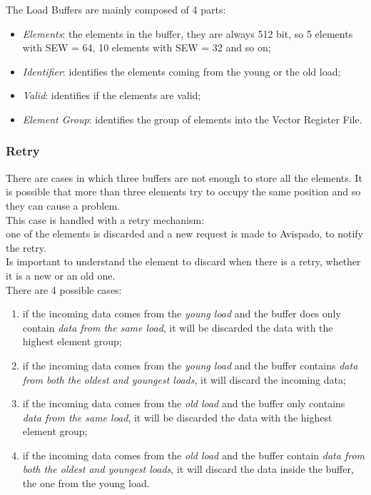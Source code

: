The Load Buffers are mainly composed of 4 parts:
\begin{itemize}
    \item \emph{Elements}: the elements in the buffer, they are always 512 bit, so 5 elements with SEW = 64, 10 elements with SEW = 32 and so on;
    
    \item \emph{Identifier}: identifies the elements coming from the young or the old load;
    
    \item \emph{Valid}: identifies if the elements are valid;
    
    \item \emph{Element Group}: identifies the group of elements into the Vector Register File. 
\end{itemize}

\subsubsection{Retry}
There are cases in which three buffers are not enough to store all the elements. It is possible that more than three elements try to occupy the same position and so they can cause a problem.\\

This case is handled with a retry mechanism:\\
one of the elements is discarded and a new request is made to Avispado, to notify the retry.\\

Is important to understand the element to discard when there is a retry, whether it is a new or an old one.\\

There are 4 possible cases:
\begin{enumerate}
    \item if the incoming data comes from the \emph{young load} and the buffer does only contain \emph{data from the same load}, it will be discarded the data with the highest element group;
    
    \item if the incoming data comes from the \emph{young load} and the buffer contains \emph{data from both the oldest and youngest loads}, it will discard the incoming data;
    
    \item if the incoming data comes from the \emph{old load} and the buffer only contains \emph{data from the same load}, it will be discarded the data with the highest element group;
    
    \item if the incoming data comes from the \emph{old load} and the buffer contain \emph{data from both the oldest and youngest loads}, it will discard the data inside the buffer, the one from the young load.
\end{enumerate}



